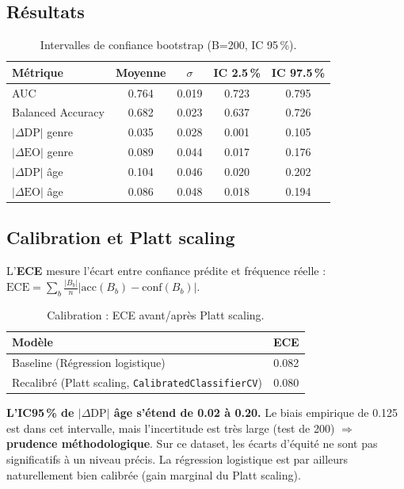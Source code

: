 \documentclass[11pt, a4paper]{article}
\begin{document}
\subsection{R\'{e}sultats}

\begin{table}[H]
\centering
\begin{tabular}{lcccc}
\toprule
\textbf{M\'{e}trique} & \textbf{Moyenne} & \textbf{$\sigma$} & \textbf{IC 2.5\,\%} & \textbf{IC 97.5\,\%} \\
\midrule
AUC                  & 0.764 & 0.019 & 0.723 & 0.795 \\
Balanced Accuracy    & 0.682 & 0.023 & 0.637 & 0.726 \\
$|\Delta\text{DP}|$ genre & 0.035 & 0.028 & 0.001 & 0.105 \\
$|\Delta\text{EO}|$ genre & 0.089 & 0.044 & 0.017 & 0.176 \\
$|\Delta\text{DP}|$ \^{a}ge  & 0.104 & 0.046 & 0.020 & 0.202 \\
$|\Delta\text{EO}|$ \^{a}ge  & 0.086 & 0.048 & 0.018 & 0.194 \\
\bottomrule
\end{tabular}
\caption{Intervalles de confiance bootstrap (B=200, IC 95\,\%).}
\end{table}

\subsection{Calibration et Platt scaling}

L'\textbf{ECE} mesure l'\'{e}cart entre confiance pr\'{e}dite et fr\'{e}quence r\'{e}elle :
$\text{ECE} = \sum_b \frac{|B_b|}{n} |\text{acc}(B_b) - \text{conf}(B_b)|$.

\begin{table}[H]
\centering
\begin{tabular}{lc}
\toprule
\textbf{Mod\`{e}le} & \textbf{ECE} \\
\midrule
Baseline (R\'{e}gression logistique) & 0.082 \\
Recalibr\'{e} (Platt scaling, \texttt{CalibratedClassifierCV}) & 0.080 \\
\bottomrule
\end{tabular}
\caption{Calibration : ECE avant/apr\`{e}s Platt scaling.}
\end{table}

\begin{leconbox}[Le\c{c}on]
\textbf{L'IC95\,\% de $|\Delta\text{DP}|$ \^{a}ge s'\'{e}tend de 0.02 \`{a} 0.20.} Le biais empirique de 0.125 est dans cet intervalle, mais l'incertitude est tr\`{e}s large (test de 200) $\Rightarrow$ \textbf{prudence m\'{e}thodologique}. Sur ce dataset, les \'{e}carts d'\'{e}quit\'{e} ne sont pas significatifs \`{a} un niveau pr\'{e}cis. La r\'{e}gression logistique est par ailleurs naturellement bien calibr\'{e}e (gain marginal du Platt scaling).
\end{leconbox}
\end{document}
